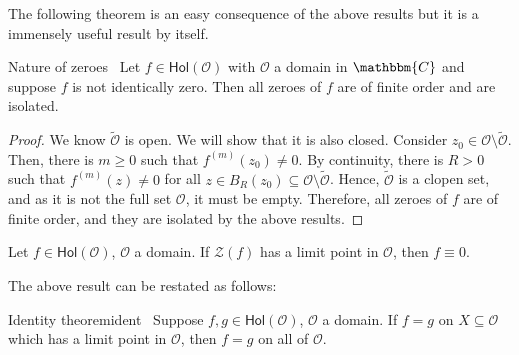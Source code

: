 \documentclass[../ComplexAnalysis_Notes.tex]{subfiles}
\begin{document}
The following theorem is an easy consequence of the above results but it is a immensely useful result by itself.

\begin{Thm}{Nature of zeroes}{}
 \, Let \( f \in \textsf{Hol}(\mathcal{O}) \) with \( \mathcal{O} \) a domain in \( \mathbbm{C} \) and suppose \( f \) is not identically zero. Then all zeroes of \( f \) are of finite order and are isolated.
 \end{Thm}

 \begin{proof} 
  We know \( \widetilde{\mathcal{O}} \) is open. We will show that it is also closed. Consider \( z_0 \in \mathcal{O} \setminus \widetilde{\mathcal{O}} \). Then, there is \( m \geq 0 \) such that \( f^{(m)}(z_0) \neq 0 \). By continuity, there is \( R > 0 \) such that \( f^{(m)}(z) \neq 0 \) for all \( z \in B_R(z_0) \subseteq \mathcal{O} \setminus \widetilde{\mathcal{O}} \). Hence, \( \widetilde{\mathcal{O}} \) is a clopen set, and as it is not the full set \( \mathcal{O} \), it must be empty. Therefore, all zeroes of \( f \) are of finite order, and they are isolated by the above results.
  \end{proof}

\begin{Cor}{}{}
 Let \( f \in \textsf{Hol}(\mathcal{O}) \), \( \mathcal{O} \) a domain. If \( \mathcal{Z}(f) \) has a limit point in \( \mathcal{O} \), then \( f \equiv 0 \).
 \end{Cor}

 The above result can be restated as follows:
 \begin{Thm}{Identity theorem}{ident}
  \, Suppose \( f,g \in \textsf{Hol}(\mathcal{O}) \), \( \mathcal{O} \) a domain. If \( f = g \) on \( X \subseteq \mathcal{O} \) which has a limit point in \( \mathcal{O} \), then \( f = g \) on all of \( \mathcal{O} \).
  \end{Thm}
\end{document}
